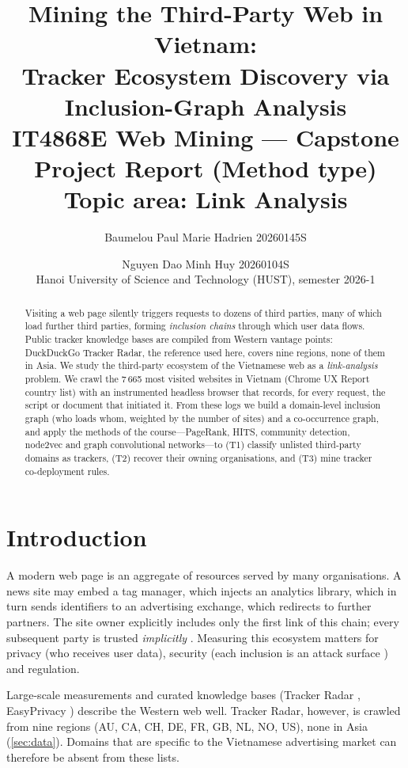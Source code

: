 \documentclass[11pt,a4paper]{article}
\title{\textbf{Mining the Third-Party Web in Vietnam:\\
Tracker Ecosystem Discovery via Inclusion-Graph Analysis}\\[6pt]
\large IT4868E Web Mining --- Capstone Project Report (Method type)\\
\normalsize Topic area: Link Analysis}
\author{Baumelou Paul Marie Hadrien 20260145S \and Nguyen Dao Minh Huy 20260104S \\[4pt]
\small Hanoi University of Science and Technology (HUST), semester 2026-1}
\begin{document}
\maketitle

\begin{abstract}
Visiting a web page silently triggers requests to dozens of third parties, many of which load
further third parties, forming \emph{inclusion chains} through which user data flows.
Public tracker knowledge bases are compiled from Western vantage points: DuckDuckGo Tracker Radar,
the reference used here, covers nine regions, none of them in Asia. We study the third-party
ecosystem of the Vietnamese web as a \emph{link-analysis} problem. We crawl the 7\,665 most
visited websites in Vietnam (Chrome UX Report country list) with an instrumented headless browser
that records, for every request, the script or document that initiated it. From these logs we
build a domain-level inclusion graph (who loads whom, weighted by the number of sites) and a
co-occurrence graph, and apply the methods of the course---PageRank, HITS, community detection,
node2vec and graph convolutional networks---to (T1) classify unlisted third-party domains as
trackers, (T2) recover their owning organisations, and (T3) mine tracker co-deployment rules.
\end{abstract}


\section{Introduction}\label{sec:intro}

A modern web page is an aggregate of resources served by many organisations. A news site may
embed a tag manager, which injects an analytics library, which in turn sends identifiers to an
advertising exchange, which redirects to further partners. The site owner explicitly includes
only the first link of this chain; every subsequent party is trusted \emph{implicitly}
\cite{ikram2019chain}. Measuring this ecosystem matters for privacy (who receives user data),
security (each inclusion is an attack surface \cite{kumar2017tangled,arshad2016include}) and
regulation.

Large-scale measurements \cite{englehardt2016online} and curated knowledge bases
(Tracker Radar \cite{trackerradar}, EasyPrivacy \cite{easyprivacy}) describe the Western
web well. Tracker Radar, however, is crawled from nine regions (AU, CA, CH, DE, FR, GB, NL, NO,
US), none in Asia (\cref{sec:data}). Domains that are specific to the Vietnamese advertising
market can therefore be absent from these lists.
\end{document}
